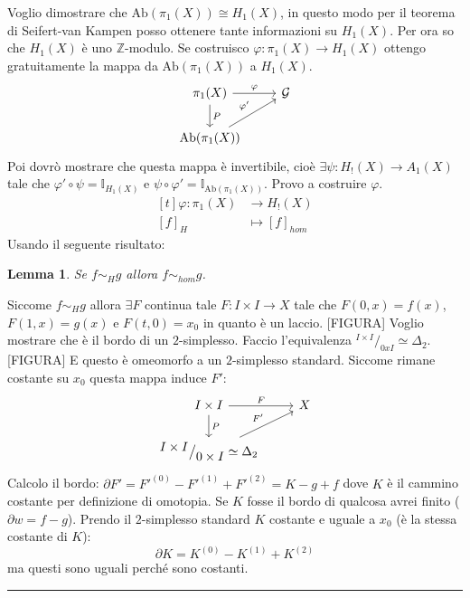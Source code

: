 \documentclass[10pt, twoside=false, x11names]{scrbook}
\newtheorem{lemma}[theorem]{Lemma}
\newenvironment{proof}{{\textbf{Dimostrazione}:}}{\hfill\rule{2mm}{2mm} \newline}
\newcommand{\Z}{\mathbb{Z}}
\renewcommand{\phi}{\varphi}
\newcommand{\Id}[1][]{\mathbb{I}_#1}
\newcommand{\Ab}[1]{\mathrm{Ab}( #1 )}
\newcommand*\quot[2]{{^{\textstyle #1}\big/_{\textstyle #2}}}
\begin{document}
Voglio dimostrare che $ \Ab{\pi_1(X)} \cong H_1(X) $, in questo modo per il teorema di Seifert-van Kampen posso ottenere tante
informazioni su $ H_1(X) $. Per ora so che $ H_1(X) $ è uno $ \Z $-modulo. Se costruisco $ \phi: \pi_1(X) \to H_1(X) $ ottengo
gratuitamente la mappa da $ \Ab{\pi_1(X)} $ a $ H_1(X) $.
\[
  \begin{tikzcd}
    \pi_1(X) \arrow{r}{\phi} \arrow{d}{P} & \mathcal{G} \\
    \Ab{\pi_1(X)} \arrow{ur}{\phi'}
  \end{tikzcd}
\]
Poi dovrò mostrare che questa mappa è invertibile, cioè $ \exists \psi:H_!(X) \to A_1(X) $ tale che $ \phi' \circ \psi = \Id{H_1(X)} $ e
$ \psi \circ \phi' = \Id{\Ab{\pi_1(X)}} $. Provo a costruire $ \phi $.
\[
  \begin{aligned}[t]
    \phi:  \pi_1(X) & \to H_!(X) \\
    [f]_H & \mapsto [f]_{hom}
  \end{aligned}
\]
Usando il seguente risultato:
\begin{lemma}
  Se $ f \sim_H g $ allora $ f \sim_{hom} g $.
\end{lemma}
\begin{proof}
  Siccome $ f \sim_{H} g $ allora $ \exists F $ continua tale $ F: I \times I \to X $ tale che $ F(0,x) = f(x) $,
  $ F(1,x) = g(x) $ e $ F(t,0) = x_0 $ in quanto è un laccio.
  [FIGURA]
  Voglio mostrare che è il bordo di un $ 2 $-simplesso. Faccio l'equivalenza $ \quot{I \times I}{0xI} \simeq \Delta_2 $.
  [FIGURA]
  E questo è omeomorfo a un $ 2 $-simplesso standard.
  Siccome rimane costante su $ x_0 $ questa mappa induce $ F' $:
  \[
    \begin{tikzcd}
      I \times I \arrow{r}{F} \arrow{d}{P} & X \\
      \quot{I \times I}{0 \times I} \simeq \Delta_2 \arrow{ur}{F'}
    \end{tikzcd}
  \]
  Calcolo il bordo: $ \partial F' = F'^{(0)} - F'^{(1)} + F'^{(2)} = K - g + f $
  dove $ K $ è il cammino costante per definizione di omotopia. Se $ K $
  fosse il bordo di qualcosa avrei finito ($ \partial w = f - g $). Prendo il $ 2 $-simplesso
  standard $ K $ costante e uguale a $ x_0 $ (è la stessa costante di $ K $):
  \[
    \partial K = K^{(0)} - K^{(1)} + K^{(2)}
  \]
  ma questi sono uguali perché sono costanti.
\end{proof}

\printindex
\end{document}
